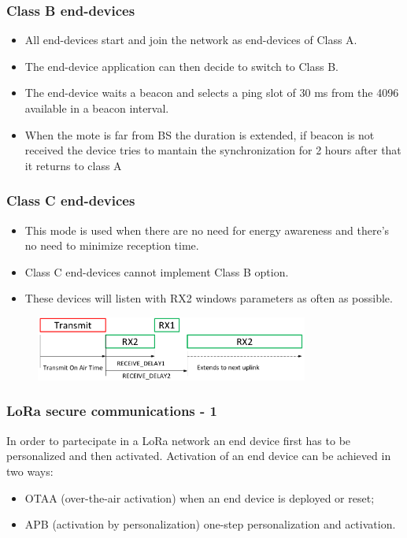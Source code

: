 \begin{frame}[fragile]
  \frametitle{Class B end-devices}
  \begin{itemize}
		\item All end-devices start and join the network as end-devices of Class A.
		\item The end-device application can then decide to switch to Class B.
		\item The end-device waits a beacon and selects a ping slot of 30 ms from the 4096 available in a beacon interval.
		\item When the mote is far from BS the duration is extended, if beacon is not received the device tries to mantain the synchronization for 2 hours after that it returns to class A
  \end{itemize}
\end{frame}

\begin{frame}[fragile]
	\frametitle{Class C end-devices}
	\begin{itemize}
		\item This mode is used when there are no need for energy awareness and there's no need to minimize reception time.
		\item Class C end-devices cannot implement Class B option.
		\item These devices will listen with RX2 windows parameters as often as possible.
	\end{itemize}
	\begin{figure}
		\centering
		\includegraphics[width=0.8\textwidth]{img/loraClassC.png}
	\end{figure}
\end{frame}


\begin{frame}[fragile]
  \frametitle{LoRa secure communications - 1}
  In order to partecipate in a LoRa network an end device first has to be personalized and then activated.
  Activation of an end device can be achieved in two ways:
  \begin{itemize}
    \item OTAA (over-the-air activation) when an end device is deployed or reset;
    \item APB (activation by personalization) one-step personalization and activation.
  \end{itemize}
\end{frame}

